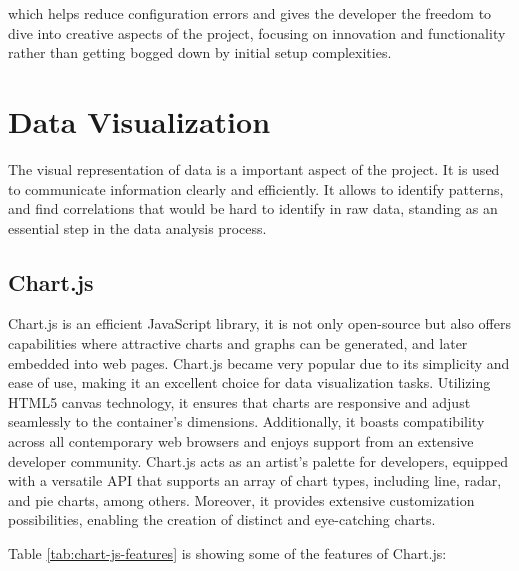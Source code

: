 which helps reduce configuration errors and gives the developer the freedom to dive into creative aspects of the project, focusing on innovation and functionality rather than getting bogged down by initial setup complexities.


\section{Data Visualization}

The visual representation of data is a important aspect of the project. It is used to communicate information clearly and efficiently. 
It allows to identify patterns, and find correlations that would be hard to identify in raw data, standing as an essential step in the data analysis process.

\subsection{Chart.js}


Chart.js is an efficient JavaScript library, it is not only open-source but also offers capabilities where attractive charts and graphs can be generated, and later
embedded into web pages. Chart.js became very popular due to its simplicity and ease of use, making it an excellent choice for data visualization tasks. Utilizing HTML5 
canvas technology, it ensures that charts are responsive and adjust seamlessly to the container's dimensions. Additionally, it boasts compatibility across 
all contemporary web browsers and enjoys support from an extensive developer community. Chart.js acts as an artist's palette for developers, equipped with 
a versatile API that supports an array of chart types, including line, radar, and pie charts, among others. Moreover, it provides extensive customization 
possibilities, enabling the creation of distinct and eye-catching charts.\cite{da2019learn}

Table \ref{tab:chart-js-features} is showing some of the features of Chart.js\cite{da2019learn}:

